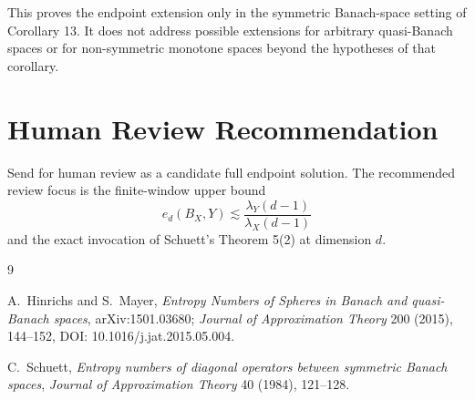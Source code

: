 \documentclass[11pt]{article}
\begin{document}
This proves the endpoint extension only in the symmetric Banach-space setting
of Corollary 13.  It does not address possible extensions for arbitrary
quasi-Banach spaces or for non-symmetric monotone spaces beyond the hypotheses
of that corollary.

\section*{Human Review Recommendation}

Send for human review as a candidate full endpoint solution.  The recommended
review focus is the finite-window upper bound
\[
  e_d(B_X,Y)\lesssim \frac{\lambda_Y(d-1)}{\lambda_X(d-1)}
\]
and the exact invocation of Schuett's Theorem 5(2) at dimension \(d\).

\begin{thebibliography}{9}

A.~Hinrichs and S.~Mayer,
\emph{Entropy Numbers of Spheres in Banach and quasi-Banach spaces},
arXiv:1501.03680; \emph{Journal of Approximation Theory} 200 (2015),
144--152, DOI: 10.1016/j.jat.2015.05.004.

C.~Schuett,
\emph{Entropy numbers of diagonal operators between symmetric Banach spaces},
\emph{Journal of Approximation Theory} 40 (1984), 121--128.

\end{thebibliography}
\end{document}

